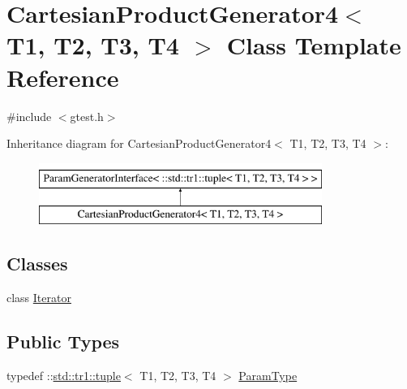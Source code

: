 \hypertarget{classtesting_1_1internal_1_1CartesianProductGenerator4}{\section{\-Cartesian\-Product\-Generator4$<$ \-T1, \-T2, \-T3, \-T4 $>$ \-Class \-Template \-Reference}
\label{d9/d3a/classtesting_1_1internal_1_1CartesianProductGenerator4}
}


{\ttfamily \#include $<$gtest.\-h$>$}

\-Inheritance diagram for \-Cartesian\-Product\-Generator4$<$ \-T1, \-T2, \-T3, \-T4 $>$\-:\begin{figure}[H]
\begin{center}
\leavevmode
\includegraphics[height=2.000000cm]{d9/d3a/classtesting_1_1internal_1_1CartesianProductGenerator4}
\end{center}
\end{figure}
\subsection*{\-Classes}
\begin{DoxyCompactItemize}
\item 
class \hyperlink{classtesting_1_1internal_1_1CartesianProductGenerator4_1_1Iterator}{\-Iterator}
\end{DoxyCompactItemize}
\subsection*{\-Public \-Types}
\begin{DoxyCompactItemize}
\item 
typedef \-::\hyperlink{classstd_1_1tr1_1_1tuple}{std\-::tr1\-::tuple}$<$ \-T1, \*
\-T2, \-T3, \-T4 $>$ \hyperlink{classtesting_1_1internal_1_1CartesianProductGenerator4_a99c0f82cb1095cf66d28100490e9fa39}{\-Param\-Type}
\end{DoxyCompactItemize}
